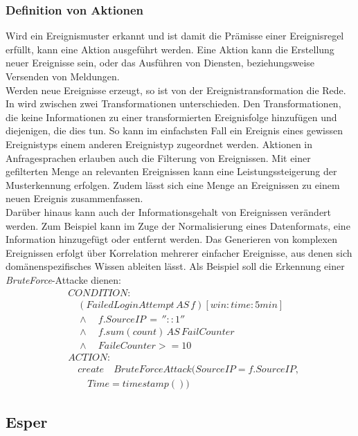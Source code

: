 \documentclass{acm_proc_article-sp}
\begin{document}
\subsubsection{Definition von Aktionen}
\vspace{0.1cm}
Wird ein Ereignismuster erkannt und ist damit die Prämisse einer Ereignisregel erfüllt, 
kann eine Aktion ausgeführt werden. Eine Aktion kann die Erstellung neuer Ereignisse 
sein, oder das Ausführen von Diensten, beziehungsweise Versenden von Meldungen.\\
Werden neue Ereignisse erzeugt, so ist von der Ereignistransformation die Rede. In 
\cite{bruns} wird zwischen zwei Transformationen unterschieden. Den Transformationen, die 
keine Informationen zu einer transformierten Ereignisfolge hinzufügen und diejenigen, die 
dies tun. So kann im einfachsten Fall ein Ereignis eines gewissen Ereignistyps einem 
anderen Ereignistyp zugeordnet werden. Aktionen in Anfragesprachen erlauben auch die 
Filterung von Ereignissen. Mit einer gefilterten Menge an relevanten Ereignissen kann 
eine Leistungssteigerung der Musterkennung erfolgen. Zudem lässt sich eine Menge an 
Ereignissen zu einem neuen Ereignis zusammenfassen.\\
Darüber hinaus kann auch der Informationsgehalt von Ereignissen verändert werden. Zum 
Beispiel kann im Zuge der Normalisierung eines Datenformats, eine Information hinzugefügt 
oder entfernt werden. Das Generieren von komplexen Ereignissen erfolgt über Korrelation 
mehrerer 
einfacher Ereignisse, aus denen sich domänenspezifisches Wissen ableiten lässt. Als 
Beispiel soll die Erkennung einer \textit{BruteForce}-Attacke dienen:
\begin{align*}
&CONDITION:\\
&\quad (FailedLoginAttempt\, AS\, f)[win:time:5min]\\
&\quad \land\quad f.SourceIP\, =\, ''::1'' \\
&\quad \land\quad f.sum(count)\, AS\, FailCounter\\
&\quad \land\quad FaileCounter >= 10\\
&ACTION:\\
&\quad create \quad BruteForceAttack(SourceIP = f.SourceIP,\\
&\quad \quad Time=timestamp())
\end{align*}

%
%
\subsection{Esper}\label{kap:esper} 
\vspace{0.1cm}
\end{document}
